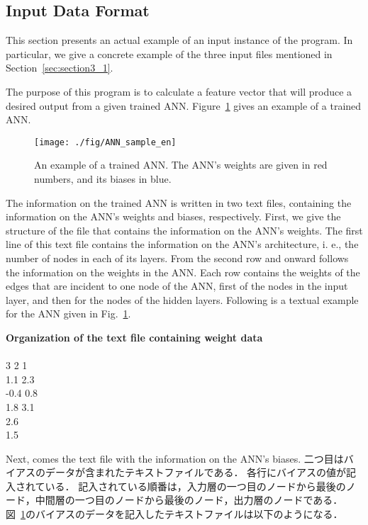 \documentclass[11pt, titlepage, dvipdfmx, twoside]{article}
\begin{document}
\subsection{Input Data Format}
\label{sec:section3_2}

This section presents an actual example of an input instance of the program.
In particular, we give a concrete example of the three input files
mentioned in Section~\ref{sec:section3_1}.

The purpose of this program is to calculate a feature vector that will produce a desired output from a 
given trained ANN.
Figure~\ref{fig:sample} gives an example of a trained ANN.


\begin{figure}[H]
  \centering
  \texttt{[image: ./fig/ANN\_sample\_en]}
  \caption{An example of a trained ANN.
		      The ANN's weights are given in red numbers, and
		      its biases in blue.
		    }
  \label{fig:sample}
\end{figure}


The information on the trained ANN is written in two text files, containing the information
on the ANN's weights and biases, respectively.
First, we give the structure of the file that contains the information on the ANN's weights.
The first line of this text file contains the information on the ANN's architecture, i. e., 
the number of nodes in each of its layers.
From the second row and onward
follows the information on the 
weights in the ANN.
Each row contains the weights of the edges that are incident to one node of the ANN,
first of the nodes in the input layer, and then for the nodes of the hidden layers.
Following is a textual example for the ANN given in Fig.~\ref{fig:sample}.

\bigskip

\begin{oframed}
{\bf Organization of the text file containing weight data}\\\\
3 2 1\\
1.1 2.3\\
-0.4 0.8\\
1.8 3.1\\
2.6\\
1.5\\
\end{oframed}

\bigskip

Next, comes the text file with the information on the ANN's biases.
二つ目はバイアスのデータが含まれたテキストファイルである．
各行にバイアスの値が記入されている．
記入されている順番は，入力層の一つ目のノードから最後のノード，中間層の一つ目のノードから最後のノード，出力層のノードである．
図~\ref{fig:sample}のバイアスのデータを記入したテキストファイルは以下のようになる．
\end{document}
